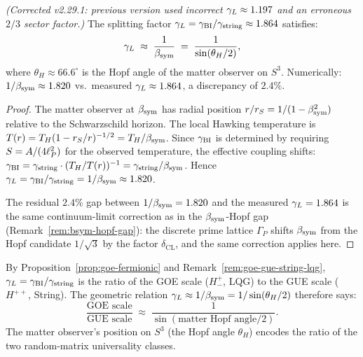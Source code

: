 \begin{theorem}
\label{thm:dual-origin}
\emph{(Corrected v2.29.1: previous version used incorrect $\gamma_L\approx 1.197$
and an erroneous $2/3$ sector factor.)}
The splitting factor $\gamma_L=\gamma_{\mathrm{BI}}/\gamma_{\mathrm{string}}\approx 1.864$ satisfies:
\[
  \gamma_L \;\approx\; \frac{1}{\beta_{\mathrm{sym}}} \;=\; \frac{1}{\sin(\theta_H/2)},
\]
where $\theta_H\approx 66.6^\circ$ is the Hopf angle of the matter observer
on $S^3$. Numerically: $1/\beta_{\mathrm{sym}} \approx 1.820$ vs.\ measured
$\gamma_L\approx 1.864$, a discrepancy of $2.4\%$.
\end{theorem}

\begin{proof}
The matter observer at $\beta_{\mathrm{sym}}$ has radial position $r/r_S=1/(1-\beta_{\mathrm{sym}}^2)$
relative to the Schwarzschild horizon.
The local Hawking temperature is $T(r)=T_H(1-r_S/r)^{-1/2}=T_H/\beta_{\mathrm{sym}}$.
Since $\gamma_{\mathrm{BI}}$ is determined by requiring $S=A/(4\ell_P^2)$ for the observed
temperature, the effective coupling shifts:
$\gamma_{\mathrm{BI}} = \gamma_{\mathrm{string}}\cdot(T_H/T(r))^{-1} = \gamma_{\mathrm{string}}/\beta_{\mathrm{sym}}$.
Hence $\gamma_L = \gamma_{\mathrm{BI}}/\gamma_{\mathrm{string}} = 1/\beta_{\mathrm{sym}} \approx 1.820$.

The residual $2.4\%$ gap between $1/\beta_{\mathrm{sym}}=1.820$ and the measured
$\gamma_L=1.864$ is the same continuum-limit correction as in the $\beta_{\mathrm{sym}}$-Hopf
gap (Remark~\ref{rem:bsym-hopf-gap}): the discrete prime lattice
$\Gamma_P$ shifts $\beta_{\mathrm{sym}}$ from the Hopf candidate $1/\sqrt{3}$ by
the factor $\delta_{\mathrm{CL}}$, and the same correction applies here.
\end{proof}

\begin{remark}
\label{rem:dual-origin-goe-gue}
By Proposition~\ref{prop:goe-fermionic} and
Remark~\ref{rem:goe-gue-string-lqg},
$\gamma_L = \gamma_{\mathrm{BI}}/\gamma_{\mathrm{string}}$ is the ratio of the GOE scale ($H^+_-$, LQG) to
the GUE scale ($H^{++}$, String). The geometric relation $\gamma_L\approx
1/\beta_{\mathrm{sym}} = 1/\sin(\theta_H/2)$ therefore says:
\[
  \frac{\text{GOE scale}}{\text{GUE scale}}
  \;\approx\;
  \frac{1}{\sin(\text{matter Hopf angle}/2)}.
\]
The matter observer's position on $S^3$ (the Hopf angle $\theta_H$)
encodes the ratio of the two random-matrix universality classes.
\end{remark}

